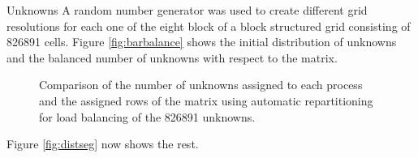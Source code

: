 Unknowns
A random number generator was used to create different grid resolutions for each one of the eight block of a block structured grid consisting of 826891 cells. Figure \ref{fig:barbalance} shows the initial distribution of unknowns and the balanced number of unknowns with respect to the matrix.
\begin{figure}[h!]
  \centering
{}
\caption{Comparison of the number of unknowns assigned to each process and the assigned rows of the matrix using automatic repartitioning for load balancing of the 826891 unknowns.}
\label{fig:distcpld}
\end{figure}

Figure \ref{fig:distseg} now shows the rest.

